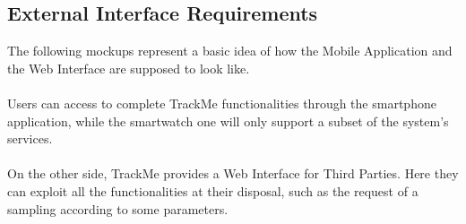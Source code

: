 \documentclass[12pt,a4paper]{article}
\begin{document}
		\subsection{External Interface Requirements}
			The following mockups represent a basic idea of how the Mobile Application and the Web Interface are supposed to look like.
			\\ \\
			Users can access to complete TrackMe functionalities through the smartphone application, while the smartwatch one will only support a subset of the system's services.
			\\ \\
			On the other side, TrackMe provides a Web Interface for Third Parties. Here they can exploit all the functionalities at their disposal, such as the request of a sampling according to some parameters.
\end{document}
